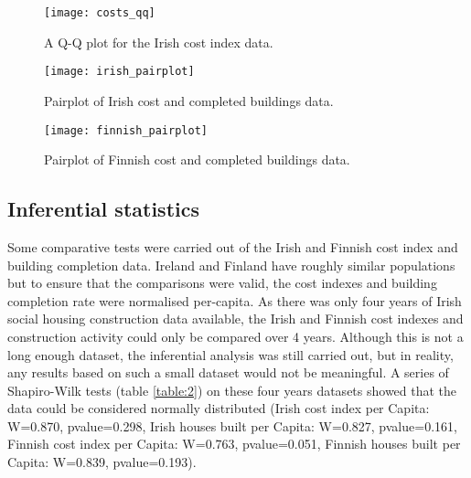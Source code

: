 \documentclass[hidelinks,12pt,oneside]{report} %
\begin{document}
\begin{figure}[!ht]
	\centering
	\vspace{.4218cm}
		\texttt{[image: costs\_qq]}	\captionsetup{justification=justified,width=1\linewidth}
	\caption{A Q-Q plot for the Irish cost index data.}
\label{fig:costs_qq}
\end{figure}

\begin{figure}[!ht]
	\centering
	\vspace{.4218cm}
		\texttt{[image: irish\_pairplot]}	\captionsetup{justification=justified,width=1\linewidth}
	\caption{Pairplot of Irish cost and completed buildings data.}
\label{fig:irish_pairplot}
\end{figure}

\begin{figure}[!ht]
	\centering
	\vspace{.4218cm}
		\texttt{[image: finnish\_pairplot]}	\captionsetup{justification=justified,width=1\linewidth}
	\caption{Pairplot of Finnish cost and completed buildings data.}
\label{fig:finnish_pairplot}
\end{figure}

\subsection{Inferential statistics}
Some comparative tests were carried out of the Irish and Finnish cost index and building completion data. Ireland and Finland have roughly similar populations \citep{eurostat} but to ensure that the comparisons were valid, the cost indexes and building completion rate were normalised per-capita. As there was only four years of Irish social housing construction data available, the Irish and Finnish cost indexes and construction activity could only be compared over 4 years. Although this is not a long enough dataset, the inferential analysis was still carried out, but in reality, any results based on such a small dataset would not be meaningful. A series of Shapiro-Wilk tests (table \ref{table:2}) on these four years datasets showed that the data could be considered normally distributed (Irish cost index per Capita: W=0.870, pvalue=0.298, Irish houses built per Capita: W=0.827, pvalue=0.161, Finnish cost index per Capita: W=0.763, pvalue=0.051, Finnish houses built per Capita: W=0.839, pvalue=0.193).
\end{document}
